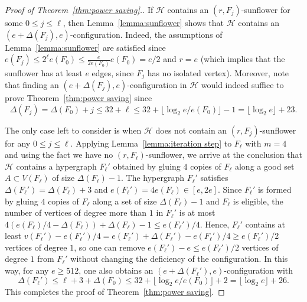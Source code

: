 \documentclass[11pt]{article}
\numberwithin{equation}{section}
\def\cH{\mathcal{H}}
\theoremstyle{plain}
\theoremstyle{remark}
\begin{document}
\begin{proof}[Proof of Theorem~\ref{thm:power saving}.]
If $\cH$ contains an $(r, F_j)$-sunflower for some $0\leq j\leq \ell$, then Lemma~\ref{lemma:sunflower} shows that $\cH$ contains an $(e+\Delta(F_j), e)$-configuration. Indeed, the assumptions of Lemma~\ref{lemma:sunflower} are satisfied since $e(F_j)\leq 2^\ell e(F_0)\leq \frac{e}{2e(F_0)}e(F_0)=e/2$ and $r=e$ (which implies that the sunflower has at least $e$ edges, since $F_j$ has no isolated vertex). Moreover, note that finding an $(e+\Delta(F_j), e)$-configuration in $\cH$ would indeed suffice to prove Theorem~\ref{thm:power saving} since
\[\Delta(F_j)=\Delta(F_0)+j\leq 32+\ell\leq 32+\lfloor \log_2 e/e(F_0) \rfloor -1= \lfloor \log_2 e\rfloor +23.\]

The only case left to consider is when $\cH$ does not contain an $(r, F_j)$-sunflower for any $0\leq j\leq \ell$. Applying Lemma~\ref{lemma:iteration step} to $F_\ell$ with $m=4$ and using the fact we have no $(r, F_\ell)$-sunflower, we arrive at the conclusion that $\cH$ contains a hypergraph $F_\ell'$ obtained by gluing $4$ copies of $F_\ell$ along a good set $A\subset V(F_\ell)$ of size $\Delta(F_\ell)-1$. The hypergraph $F_\ell'$ satisfies $\Delta(F_\ell')=\Delta(F_\ell)+3$ and $e(F_\ell')=4e(F_\ell)\in [e, 2e]$. Since $F_\ell'$ is formed by gluing $4$ copies of $F_\ell$ along a set of size $\Delta(F_\ell)-1$ and $F_\ell$ is eligible, the number of vertices of degree more than $1$ in $F_\ell'$ is at most $4(e(F_\ell)/4-\Delta(F_\ell))+\Delta(F_\ell)-1\leq e(F_\ell')/4$. Hence, $F_\ell'$ contains at least $v(F_\ell')-e(F_\ell')/4 = e(F_\ell')+\Delta(F_\ell')-e(F_\ell')/4 \ge e(F_\ell')/2$ vertices of degree $1$, so one can remove $e(F_\ell')-e\leq e(F_\ell')/2$ vertices of degree $1$ from $F_\ell'$ without changing the deficiency of the configuration. In this way, for any $e \ge 512$, one also obtains an $(e+\Delta(F_\ell'), e)$-configuration with \[ \Delta(F_\ell')\leq \ell+3+\Delta(F_0)\leq 32+\lfloor \log_2 e/e(F_0)\rfloor+2= \lfloor \log_2 e\rfloor +26.\]
This completes the proof of Theorem~\ref{thm:power saving}.
\end{proof}
\end{document}
